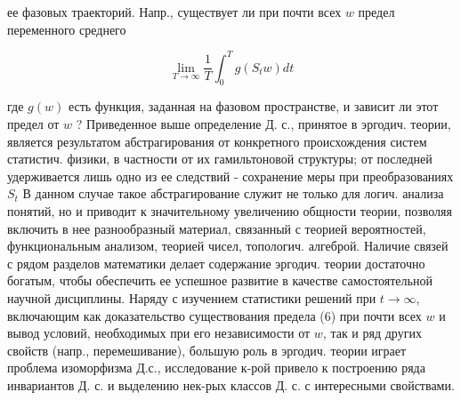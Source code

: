 \documentclass[10pt]{article}
\begin{document}
ее фазовых траекторий. Напр., существует ли при почти всех $w$ предел переменного среднего



\[

\lim _{T \rightarrow \infty} \frac{1}{T} \int_{0}^{T} g\left(S_{t} w\right) d t

\]



где $g(w)$ есть функция, заданная на фазовом пространстве, и зависит ли этот предел от $w$ ? Приведенное выше определение Д. с., принятое в эргодич. теории, является результатом абстрагирования от конкретного происхождения систем статистич. физики, в частности от их гамильтоновой структуры; от последней удерживается лишь одно из ее следствий - сохранение меры при преобразованиях $S_{t}$ В данном случае такое абстрагирование служит не только для логич. анализа понятий, но и приводит к значительному увеличению общности теории, позволяя включить в нее разнообразный материал, связанный с теорией вероятностей, функциональным анализом, теорией чисел, топологич. алгеброй. Наличие связей с рядом разделов математики делает содержание эргодич. теории достаточно богатым, чтобы обеспечить ее успешное развитие в качестве самостоятельной научной дисциплины. Наряду с изучением статистики решений при $t \rightarrow \infty$, включающим как доказательство существования предела (6) при почти всех $w$ и вывод условий, необходимых при его независимости от $w$, так и ряд других свойств (напр., перемешивание), большую роль в эргодич. теории играет проблема изоморфизма Д.с., исследование к-рой привело к построению ряда инвариантов Д. с. и выделению нек-рых классов Д. с. с интересными свойствами.
\end{document}

